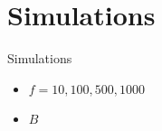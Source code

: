 \documentclass[aspectratio=169]{beamer}
\begin{document}


\section{Simulations}

\begin{frame}{Simulations}
\begin{itemize}
\item $f=10,100,500,1000$
\item $B$
\end{itemize}
\end{frame}
\end{document}
